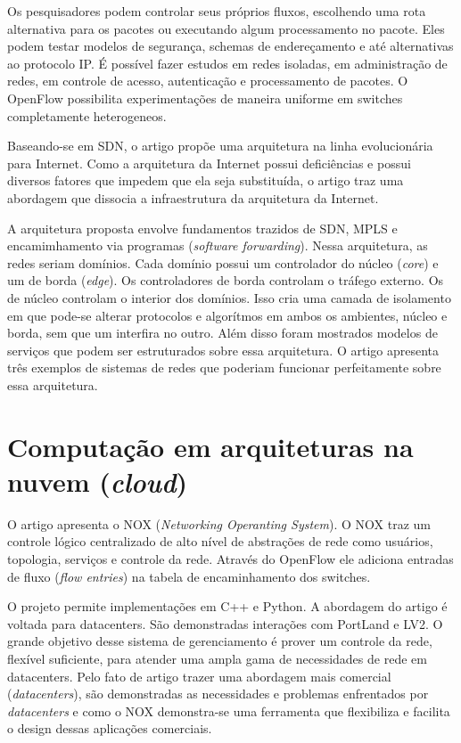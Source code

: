 Os pesquisadores podem controlar seus próprios fluxos, escolhendo uma rota
alternativa para os pacotes ou executando algum processamento no pacote. 
Eles podem testar modelos de segurança, schemas de endereçamento e até 
alternativas ao protocolo IP. 
É possível fazer estudos em redes isoladas, em administração de redes, 
em controle de acesso, autenticação e processamento de pacotes.
O OpenFlow possibilita experimentações de maneira uniforme em switches 
completamente heterogeneos. 

Baseando-se em SDN, o artigo \citep{barath2012software} propõe uma arquitetura 
na linha evolucionária para Internet.
Como a arquitetura da Internet possui deficiências e possui diversos fatores
que impedem que ela seja substituída, o artigo traz uma abordagem que dissocia 
a infraestrutura da arquitetura da Internet. 

A arquitetura proposta envolve fundamentos trazidos de SDN, MPLS e 
encamimhamento via programas (\emph{software forwarding}). 
Nessa arquitetura, as redes seriam domínios. 
Cada domínio possui um controlador do núcleo (\emph{core}) e um 
de borda (\emph{edge}). 
Os controladores de borda controlam o tráfego externo. 
Os de núcleo controlam o interior dos domínios. 
Isso cria uma camada de isolamento em que pode-se alterar protocolos e 
algorítmos em ambos os ambientes, núcleo e borda, sem que um interfira 
no outro.
Além disso foram mostrados modelos de serviços que podem ser estruturados 
sobre essa arquitetura. 
O artigo apresenta três exemplos de sistemas de redes que poderiam funcionar 
perfeitamente sobre essa arquitetura.

\section{Computação em arquiteturas na nuvem (\emph{cloud})}

O artigo \citep{arsalan2009applying} apresenta o NOX 
(\emph{Networking Operanting System}). 
O NOX traz um controle lógico centralizado de alto nível de abstrações de 
rede como usuários, topologia, serviços e controle da rede. 
Através do OpenFlow ele adiciona entradas de fluxo (\emph{flow entries}) na 
tabela de encaminhamento dos switches. 

O projeto permite implementações em C++ e Python. 
A abordagem do artigo é voltada para datacenters. 
São demonstradas interações com PortLand e LV2. 
O grande objetivo desse sistema de gerenciamento é prover um controle da rede,
flexível suficiente, para atender uma ampla gama de necessidades de rede em 
datacenters. 
Pelo fato de artigo trazer uma abordagem mais comercial (\emph{datacenters}), 
são demonstradas as necessidades e problemas enfrentados por 
\emph{datacenters} e como o NOX demonstra-se uma ferramenta que flexibiliza 
e facilita o design dessas aplicações comerciais.

